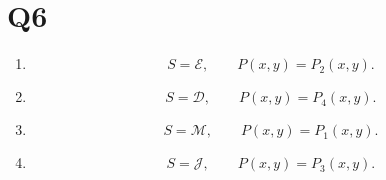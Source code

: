 \documentclass[11pt]{article}
\date{\today}
\begin{document}
\maketitle
\tableofcontents

\newpage






\section{Q6}
\begin{enumerate}
    \item 
    \[
    S = \mathcal{E},
    \qquad
    P(x,y) = P_2(x,y).
    \]

    \item 
    \[
    S = \mathcal{D},
    \qquad
    P(x,y) = P_4(x,y).
    \]

    \item 
    \[
    S = \mathcal{M},
    \qquad
    P(x,y) = P_1(x,y).
    \]

    \item 
    \[
    S = \mathcal{J},
    \qquad
    P(x,y) = P_3(x,y).
    \]
\end{enumerate}
\end{document}
